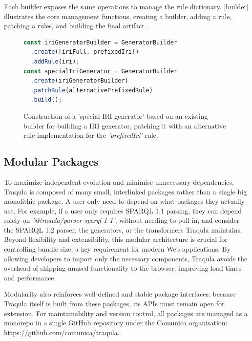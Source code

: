 \documentclass[runningheads]{llncs}
\begin{document}
    Each builder exposes the same operations to manage the rule dictionary.
    \autoref{builder} illustrates the core management functions,
    creating a builder, adding a rule, patching a rules, and building the final artifact .

    \begin{figure}[tbp]
        \centering
        \begin{lstlisting}[language=JavaScript,basicstyle=\fontsize{6}{7.6}\ttfamily,breaklines=true]
const iriGeneratorBuilder = GeneratorBuilder
  .create([iriFull, prefixedIri])
  .addRule(iri);
const specialIriGenerator = GeneratorBuilder
  .create(iriGeneratorBuilder)
  .patchRule(alternativePrefixedRule)
  .build();
        \end{lstlisting}
        \caption{Construction of a 'special IRI generator' based on an existing builder for building a IRI generator,
            patching it with an alternative rule implementation for the \textit{'prefixedIri'} rule.}
        \label{builder}
        \vspace{-12pt}
    \end{figure}

    \subsection{Modular Packages}

    To maximize independent evolution and minimise unnecessary dependencies,
    Traqula is composed of many small, interlinked packages rather than a single big monolithic package.
    A user only need to depend on what packages they actually use.
    For example, if a user only requires SPARQL 1.1 parsing, they can depend solely on \textit{'@traqula/parser-sparql-1-1'},
    without needing to pull in, and consider the SPARQL 1.2 parser, the generators, or the transformers Traqula maintains.
    Beyond flexibility and extensibility, this modular architecture is crucial for controlling bundle size, a key requirement for modern Web applications.
    By allowing developers to import only the necessary components, Traqula avoids the overhead of shipping unused functionality to the browser,
    improving load times and performance.

    Modularity also reinforces well-defined and stable package interfaces: because Traqula itself is built from these packages,
    its APIs must remain open for extension.
    For maintainability and version control, all packages are managed as a monorepo in a single GitHub repository under the Comunica organisation:
    https://github.com/comunica/traqula.
\end{document}
